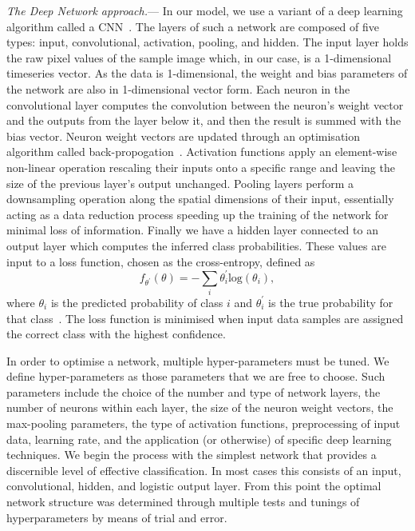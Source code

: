\documentclass[%
showpacs,
 amsmath,amssymb,
 aps,
 twocolumn,
 prl,
 reprint,
floatfix,
]{revtex4-1}
\begin{document}
%
% 
\textit{The Deep Network approach.}--- 
%
%
In our model, we use a variant of a deep learning algorithm called a
\ac{CNN}~\cite{726791}. The layers of such a network are composed of five
types: input, convolutional, activation, pooling, and hidden. The input layer
holds the raw pixel values of the sample image which, in our case, is a
1-dimensional timeseries vector. As the data is 1-dimensional, the weight and
bias parameters of the network are also in 1-dimensional vector form. Each
neuron in the convolutional layer computes the convolution between the neuron's
weight vector and the outputs from the layer below it, and then the result is
summed with the bias vector. Neuron weight vectors are updated through an
optimisation algorithm called back-propogation~\cite{LeCun1998}. Activation
functions apply an element-wise non-linear operation rescaling their
inputs onto a specific range and leaving the size of the previous layer's
output unchanged. Pooling layers perform a downsampling operation along the
spatial dimensions of their input, essentially acting as a data reduction
process speeding up the training of the network for minimal loss of
information. Finally we have a hidden layer connected to an output
layer which computes the inferred class probabilities. These values are input
to a loss function, chosen as the cross-entropy, defined as
%
%
\begin{equation} \label{eq:loss} 
f_{\theta^{'}}(\theta) = -\sum_{i}\theta_{i}^{'} \mathrm{log}(\theta_{i}), 
\end{equation}
%
where $\theta_{i}$ is the predicted probability of class $i$ and
$\theta_{i}^{'}$ is the true probability for that
class~\cite{tensorflow2015-whitepaper}. The loss function is minimised when
input data samples are assigned the correct class with the highest confidence. 

%
%
In order to optimise a network, multiple hyper-parameters must be tuned.  We
define hyper-parameters as those parameters that we are free to choose. Such
parameters include the choice of the number and type of network layers, the
number of neurons within each layer, the size of the neuron weight vectors, the
max-pooling parameters, the type of activation functions, preprocessing of
input data, learning rate, and the application (or otherwise) of specific deep
learning techniques. We begin the process with the simplest network that
provides a discernible level of effective classification. In most cases this
consists of an input, convolutional, hidden, and logistic output layer.
From this point the optimal network structure was determined through multiple
tests and tunings of hyperparameters by means of trial and error.
\end{document}
